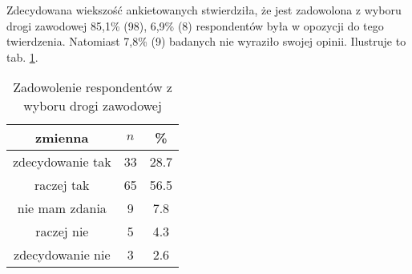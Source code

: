 
Zdecydowana wiekszość ankietowanych stwierdziła, że jest zadowolona z wyboru drogi zawodowej 85,1\% (98), 6,9\% (8) respondentów była w opozycji do tego twierdzenia. Natomiast 7,8\% (9) badanych nie wyraziło swojej opinii. Ilustruje to tab. \ref{tab:Q5}.

\begin{table}[H]
\caption{Zadowolenie respondentów z wyboru drogi zawodowej}
\centering
\begin{tabular}{ | c | c | c |}
\hline
zmienna & $n$ & \% \\
\hline
zdecydowanie tak  &  33  & 28.7 \\
\hline
raczej tak  &  65  & 56.5\\
\hline
nie mam zdania  &  9  & 7.8 \\
\hline
raczej nie  &  5  & 4.3 \\
\hline
zdecydowanie nie  &  3  & 2.6 \\
\hline
\end{tabular}
\label{tab:Q5}
\end{table}

